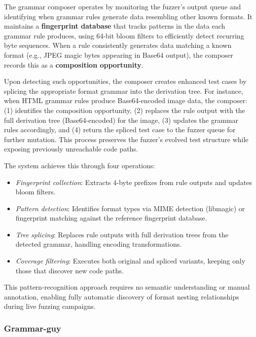 The grammar composer operates by monitoring the fuzzer's output queue and identifying when grammar rules generate data resembling other known formats.
It maintains a \textbf{fingerprint database} that tracks patterns in the data each grammar rule produces, using 64-bit bloom filters to efficiently detect recurring byte sequences.
When a rule consistently generates data matching a known format (e.g., JPEG magic bytes appearing in Base64 output), the composer records this as a \textbf{composition opportunity}.

Upon detecting such opportunities, the composer creates enhanced test cases by splicing the appropriate format grammar into the derivation tree.
For instance, when HTML grammar rules produce Base64-encoded image data, the composer: (1) identifies the composition opportunity, (2) replaces the rule output with the full derivation tree (Base64-encoded) for the image, (3) updates the grammar rules accordingly, and (4) return the spliced test case to the fuzzer queue for further mutation.
This process preserves the fuzzer's evolved test structure while exposing previously unreachable code paths.

The system achieves this through four operations:

\begin{itemize}
\item \textit{Fingerprint collection}: Extracts 4-byte prefixes from rule outputs and updates bloom filters.

\item \textit{Pattern detection}: Identifies format types via MIME detection (libmagic) or fingerprint matching against the reference fingerprint database.

\item \textit{Tree splicing}: Replaces rule outputs with full derivation trees from the detected grammar, handling encoding transformations.

\item \textit{Coverage filtering}: Executes both original and spliced variants, keeping only those that discover new code paths.
\end{itemize}

This pattern-recognition approach requires no semantic understanding or manual annotation, enabling fully automatic discovery of format nesting relationships during live fuzzing campaigns.


\subsubsection{Grammar-guy}

